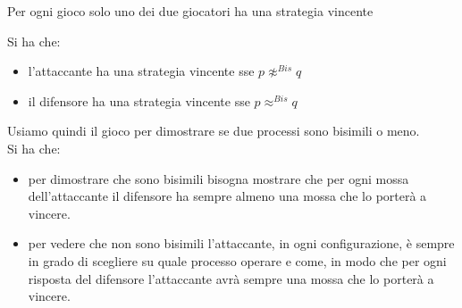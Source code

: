 \begin{definizione}
  Per ogni gioco solo uno dei due giocatori ha una strategia vincente
\end{definizione} \vspace{5mm} %
\begin{definizione}
  Si ha che:
  \begin{itemize}
    \item l'attaccante ha una strategia vincente sse $p\not\approx^{Bis}q$
    \item il difensore ha una strategia vincente sse $p\approx^{Bis}q$
  \end{itemize}
\end{definizione} \vspace{5mm} %
Usiamo quindi il gioco per dimostrare se due processi sono bisimili o meno.\\
Si ha che:
\begin{itemize}
  \item per dimostrare che sono bisimili bisogna mostrare che per ogni mossa
  dell'attaccante il difensore ha sempre almeno una mossa che lo porterà a
  vincere.
  
  \item per vedere che non sono bisimili l'attaccante, in ogni configurazione, è
  sempre in grado di scegliere su quale processo operare e come, in modo che per
  ogni risposta del difensore l'attaccante avrà sempre una mossa che lo porterà
  a vincere. 
\end{itemize}

